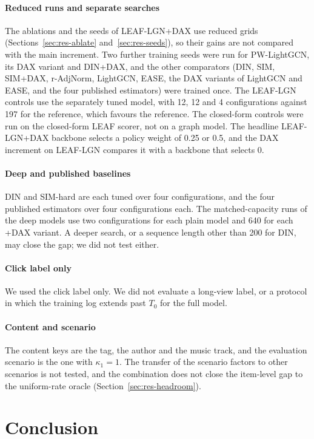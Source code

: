 \documentclass[preprint,12pt,authoryear]{elsarticle}
\begin{document}
\paragraph{Reduced runs and separate searches} The ablations and the seeds of LEAF-LGN+DAX use reduced grids (Sections~\ref{sec:res-ablate}
and~\ref{sec:res-seeds}), so their gains are not compared with the main increment. Two further training seeds were run for PW-LightGCN, its DAX variant and DIN+DAX, and the other comparators (DIN, SIM, SIM+DAX, r-AdjNorm, LightGCN, EASE, the DAX variants of LightGCN and EASE, and the four published estimators) were trained once. The LEAF-LGN controls use the separately tuned model, with 12, 12 and 4 configurations against 197 for the
reference, which favours the reference. The closed-form controls were run on the closed-form LEAF scorer, not on a graph model. The headline
LEAF-LGN+DAX backbone selects a policy weight of 0.25 or 0.5, and the DAX increment on LEAF-LGN compares it with a backbone that selects 0.

\paragraph{Deep and published baselines} DIN and SIM-hard are each tuned over four configurations, and the four published estimators over four
configurations each. The matched-capacity runs of the deep models use two configurations for each plain model and 640 for each +DAX variant. A
deeper search, or a sequence length other than 200 for DIN, may close the gap; we did not test either.

\paragraph{Click label only} We used the click label only. We did not evaluate a long-view label, or a protocol in which the training log extends
past $T_0$ for the full model.

\paragraph{Content and scenario} The content keys are the tag, the author and the music track, and the evaluation scenario is the one with
$\kappa_1=1$. The transfer of the scenario factors to other scenarios is not tested, and the combination does not close the item-level gap to the
uniform-rate oracle (Section~\ref{sec:res-headroom}).

\section{Conclusion}
\label{sec:conclusion}
\end{document}
